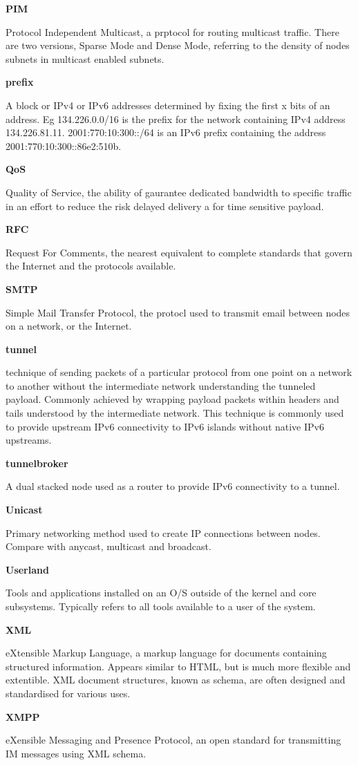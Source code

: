 \textbf{PIM}

Protocol Independent Multicast, a prptocol for routing multicast
traffic. There are two versions, Sparse Mode and Dense Mode, referring
to the density of nodes subnets in multicast enabled subnets.

\textbf{prefix}

A block or IPv4 or IPv6 addresses determined by fixing the first x bits
of an address. Eg 134.226.0.0/16 is the prefix for the network
containing IPv4 address 134.226.81.11. 2001:770:10:300::/64 is an IPv6
prefix containing the address 2001:770:10:300::86e2:510b. 

\textbf{QoS}

Quality of Service, the ability of gaurantee dedicated bandwidth to
specific traffic in an effort to reduce the risk delayed delivery a for
time sensitive payload.

\textbf{RFC}

Request For Comments, the nearest equivalent to complete standards that
govern the Internet and the protocols available.

\textbf{SMTP}

Simple Mail Transfer Protocol, the protocl used to transmit email
between nodes on a network, or the Internet.

\textbf{tunnel}

technique of sending packets of a particular protocol from one point on
a network to another without the intermediate network understanding the
tunneled payload. Commonly achieved by wrapping payload packets within
headers and tails understood by the intermediate network. This
technique is commonly used to provide upstream IPv6 connectivity to IPv6
islands without native IPv6 upstreams.

\textbf{tunnelbroker}

A dual stacked node used as a router to provide IPv6 connectivity to a
tunnel.

\textbf{Unicast}

Primary networking method used to create IP connections between nodes.
Compare with anycast, multicast and broadcast.

\textbf{Userland}

Tools and applications installed on an O/S outside of the kernel and
core subsystems. Typically refers to all tools available to a user of
the system.

\textbf{XML}

eXtensible Markup Language, a markup language for documents containing
structured information. Appears similar to HTML, but is much more
flexible and extentible. XML document structures, known as schema, are
often designed and standardised for various uses.

\textbf{XMPP}

eXensible Messaging and Presence Protocol, an open standard for
transmitting IM messages using XML schema.
